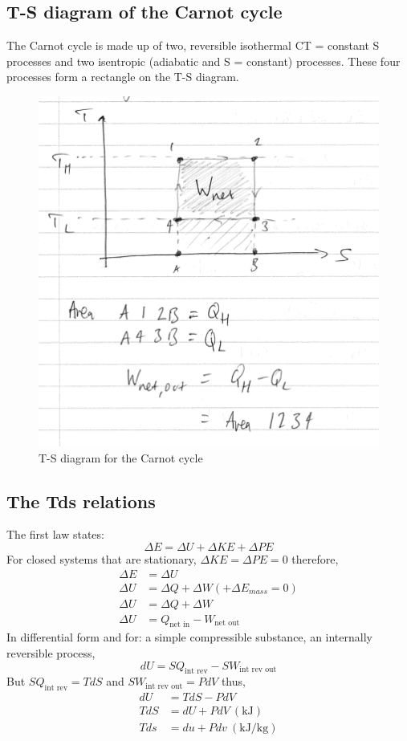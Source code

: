\documentclass[class=report, crop=false, 12pt,a4paper]{standalone}
\begin{document}
\subsection{T-S diagram of the Carnot cycle}
The Carnot cycle is made up of two, reversible isothermal CT = constant S processes and two isentropic (adiabatic and S = constant) processes. These four processes form a rectangle on the T-S diagram. 
\begin{figure}
  \includegraphics[width = \textwidth]{../img/TSDiagramCarnotCycle}
  \caption{T-S diagram for the Carnot cycle}
\end{figure}
\subsection{The Tds relations}
The first law states:
\[ \Delta E = \Delta U + \Delta KE + \Delta PE \]
For closed systems that are stationary, \( \Delta KE = \Delta PE = 0 \) therefore, 
\begin{align*}
  \Delta E &= \Delta U\\
  \Delta U &= \Delta Q + \Delta W (+ \Delta E_{mass} = 0)\\
  \Delta U &= \Delta Q + \Delta W\\
  \Delta U &= Q_{\textrm{net in}} - W_{\textrm{net out}}
\end{align*}
In differential form and for: a simple compressible substance, an internally reversible process,
\[ dU = SQ_{\textrm{int rev}} - SW_{\textrm{int rev out}} \]
But \( SQ_{\textrm{int rev}} = T dS \) and \( SW_{\textrm{int rev out}} = PdV\) thus,
\begin{align*} 
  dU &= TdS - PdV\\
  TdS &= dU + PdV \ (\si{\kilo\joule})\\
  Tds &= du + Pdv \ (\si{\kilo\joule\per\kg})
\end{align*}
\end{document}
